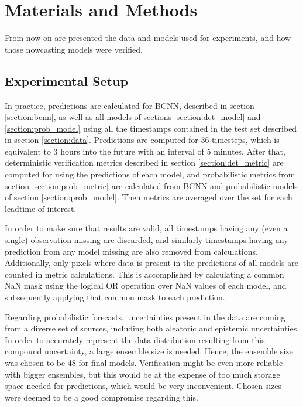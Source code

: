 \chapter{Materials and Methods}
\label{chapter:methods}

From now on are presented the data and models used for experiments, and how those nowcasting models were verified. 

\section{Experimental Setup}
\label{section:exp}

In practice, predictions are calculated for BCNN, described in section \ref{section:bcnn}, as well as all models of sections \ref{section:det_model} and \ref{section:prob_model} using all the timestamps contained in the test set described in section \ref{section:data}. Predictions are computed for 36 timesteps, which is equivalent to 3 hours into the future with an interval of 5 minutes. After that, deterministic verification metrics described in section \ref{section:det_metric} are computed for using the predictions of each model, and probabilistic metrics from section \ref{section:prob_metric} are calculated from BCNN and probabilistic models of section \ref{section:prob_model}. Then metrics are averaged over the set for each leadtime of interest. 

In order to make sure that results are valid, all timestamps having any (even a single) observation missing are discarded, and similarly timestamps having any prediction from any model missing are also removed from calculations. Additionally, only pixels where data is present in the predictions of all models are counted in metric calculations. This is accomplished by calculating a common NaN mask using the logical OR operation over NaN values of each model, and subsequently applying that common mask to each prediction.

Regarding probabilistic forecasts, uncertainties present in the data are coming from a diverse set of sources, including both aleatoric and epistemic uncertainties. In order to accurately represent the data distribution resulting from this compound uncertainty, a large ensemble size is needed. Hence, the ensemble size was chosen to be 48 for final models. Verification might be even more reliable with bigger ensembles, but this would be at the expense of too much storage space needed for predictions, which would be very inconvenient. Chosen sizes were deemed to be a good compromise regarding this.

